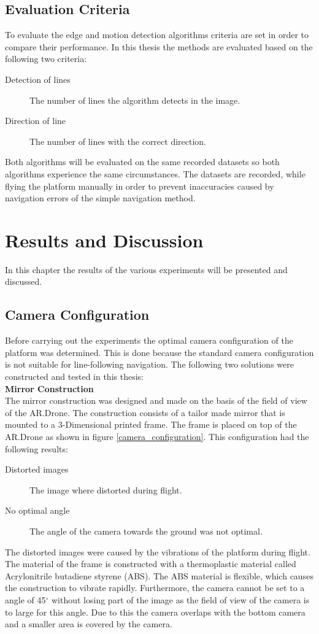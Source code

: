 \documentclass[a4paper]{article}
\begin{document}
\subsection{Evaluation Criteria}
To evaluate the edge and motion detection algorithms criteria are set in order to compare their performance. In this thesis the methods are evaluated based on the following two criteria:
\begin{description}
\item[Detection of lines] The number of lines the algorithm detects in the image.
\item[Direction of line] The number of lines with the correct direction.
\end{description}
Both algorithms will be evaluated on the same recorded datasets so both algorithms experience the same circumstances. The datasets are recorded, while flying the platform manually in order to prevent inaccuracies caused by navigation errors of the simple navigation method.

\newpage
\section{Results and Discussion}
\label{RESULTS_DISCUSSION}
In this chapter the results of the various experiments will be presented and discussed.

\subsection{Camera Configuration}
Before carrying out the experiments the optimal camera configuration of the platform was determined. This is done because the standard camera configuration is not suitable for line-following navigation. The following two solutions were constructed and tested in this thesis:\\

\noindent\textbf{Mirror Construction}\\
The mirror construction was designed and made on the basis of the field of view of the AR.Drone. The construction consists of a tailor made mirror that is mounted to a 3-Dimensional printed frame. The frame is placed on top of the AR.Drone as shown in figure \ref{camera_configuration}. This configuration had the following results:
\begin{description}
\item[Distorted images] The image where distorted during flight.
\item[No optimal angle] The angle of the camera towards the ground was not optimal.
\end{description}
The distorted images were caused by the vibrations of the platform during flight. The material of the frame is constructed with a thermoplastic material called Acrylonitrile butadiene styrene (ABS). The ABS material is flexible, which causes the construction to vibrate rapidly. Furthermore, the camera cannot be set to a angle of 45$^{\circ}$ without losing part of the image as the field of view of the camera is to large for this angle. Due to this the camera overlaps with the bottom camera and a smaller area is covered by the camera.\\
\end{document}
